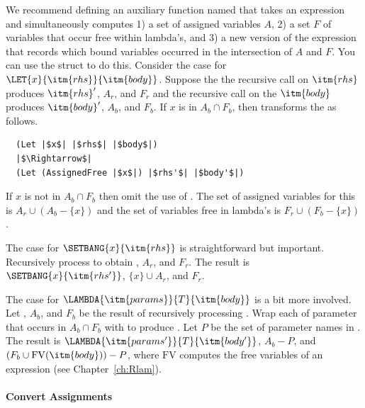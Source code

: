\documentclass[11pt]{book}
\begin{document}
We recommend defining an auxiliary function named
 that takes an expression and simultaneously
computes 1) a set of assigned variables $A$, 2) a set $F$ of variables
that occur free within lambda's, and 3) a new version of the
expression that records which bound variables occurred in the
intersection of $A$ and $F$. You can use the struct
 to do this. Consider the case for
$\LET{x}{\itm{rhs}}{\itm{body}}$.  Suppose the the recursive call on
$\itm{rhs}$ produces $\itm{rhs}'$, $A_r$, and $F_r$ and the recursive
call on the $\itm{body}$ produces $\itm{body}'$, $A_b$, and $F_b$. If
$x$ is in $A_b\cap F_b$, then transforms the  as follows.
\begin{lstlisting}
  (Let |$x$| |$rhs$| |$body$|)
  |$\Rightarrow$|
  (Let (AssignedFree |$x$|) |$rhs'$| |$body'$|)
\end{lstlisting}
If $x$ is not in $A_b\cap F_b$ then omit the use of .
The set of assigned variables for this  is
$A_r \cup (A_b - \{x\})$
and the set of variables free in lambda's is
$F_r \cup (F_b - \{x\})$.

The case for $\SETBANG{x}{\itm{rhs}}$ is straightforward but
important. Recursively process  to obtain , $A_r$,
and $F_r$. The result is $\SETBANG{x}{\itm{rhs'}}$, $\{x\} \cup A_r$,
and $F_r$.

The case for $\LAMBDA{\itm{params}}{T}{\itm{body}}$ is a bit more
involved.  Let , $A_b$, and $F_b$ be the result of
recursively processing . Wrap each of parameter that occurs
in $A_b \cap F_b$ with  to produce .
Let $P$ be the set of parameter names in .  The result is
$\LAMBDA{\itm{params'}}{T}{\itm{body'}}$, $A_b - P$, and $(F_b \cup
\mathrm{FV}(\itm{body})) - P$, where $\mathrm{FV}$ computes the free
variables of an expression (see Chapter~\ref{ch:Rlam}).

\paragraph{Convert Assignments}
\end{document}
